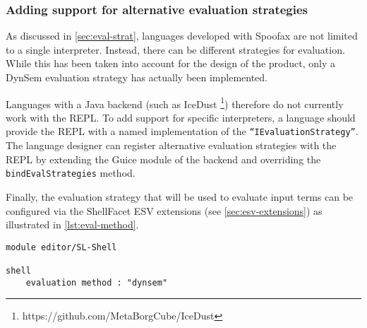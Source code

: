 \subsubsection{Adding support for alternative evaluation strategies}
\label{ssec:discuss-alternate-eval}

As discussed in \cref{sec:eval-strat}, languages developed with Spoofax are not
limited to a single interpreter. Instead, there can be different strategies for
evaluation. While this has been taken into account for the design of the
product, only a DynSem evaluation strategy has actually been implemented.

Languages with a Java backend (such as IceDust%
\footnote{https://github.com/MetaBorgCube/IceDust}) therefore do not currently
work with the REPL. To add support for specific interpreters, a language should
provide the REPL with a named implementation of the
\texttt{``IEvaluationStrategy''}. The language designer can register alternative
evaluation strategies with the REPL by extending the Guice module of the backend
and overriding the \texttt{bindEvalStrategies} method.

Finally, the evaluation strategy that will be used to evaluate input terms can
be configured via the ShellFacet ESV extensions (see \cref{sec:esv-extensions})
as illustrated in \cref{lst:eval-method}.

\begin{lstlisting}[language=esv,caption={Setting the evaluation strategy.},label={lst:eval-method}]
module editor/SL-Shell

shell
    evaluation method : "dynsem"
\end{lstlisting}

